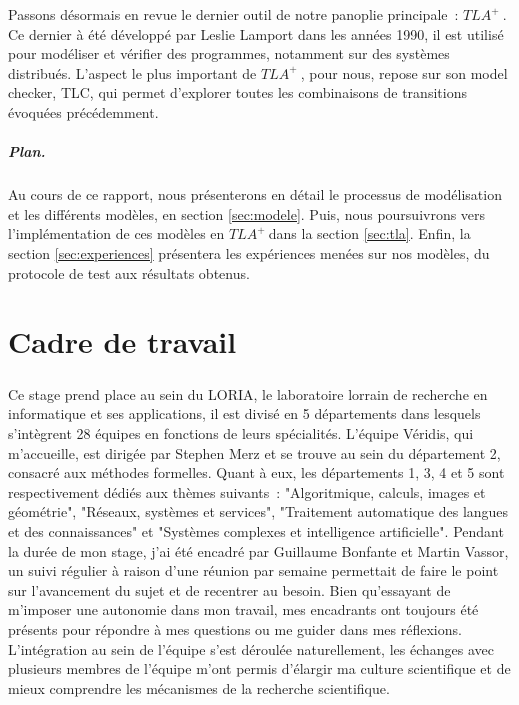 \documentclass[oneside, a4paper, 11pt]{book}
\newcommand{\TLA}{\ensuremath{TLA^+~}}
\begin{document}
\noindent
Passons désormais en revue le dernier outil de notre panoplie principale~: \TLA. 
Ce dernier à été développé par Leslie Lamport dans les années 1990, il est utilisé pour modéliser et vérifier des programmes, notamment sur des systèmes distribués. 
L'aspect le plus important de \TLA, pour nous, repose sur son model checker, TLC, qui permet d'explorer toutes les combinaisons de transitions évoquées précédemment.
\\
\paragraph{Plan.} Au cours de ce rapport, nous présenterons en détail le processus de modélisation et les différents modèles, en section \ref{sec:modele}. Puis, nous poursuivrons vers l'implémentation de ces modèles en \TLA dans la section \ref{sec:tla}.
Enfin, la section \ref{sec:experiences} présentera les expériences menées sur nos modèles, du protocole de test aux résultats obtenus.










\chapter{Cadre de travail}
\paragraph{} 
Ce stage prend place au sein du LORIA, le laboratoire lorrain de recherche en informatique et ses applications, il est divisé en 5 départements dans lesquels s'intègrent 28 équipes en fonctions de leurs spécialités.
L'équipe Véridis, qui m'accueille, est dirigée par Stephen Merz et se trouve au sein du département 2, consacré aux méthodes formelles. Quant à eux, les départements 1, 3, 4 et 5 sont respectivement dédiés aux thèmes suivants~: "Algoritmique, calculs, images et géométrie", "Réseaux, systèmes et services", "Traitement automatique des langues et des connaissances" et "Systèmes complexes et intelligence artificielle".
Pendant la durée de mon stage, j'ai été encadré par Guillaume Bonfante et Martin Vassor, un suivi régulier à raison d'une réunion par semaine permettait de faire le point sur l'avancement du sujet et de recentrer au besoin.
Bien qu'essayant de m'imposer une autonomie dans mon travail, mes encadrants ont toujours été présents pour répondre à mes questions ou me guider dans mes réflexions.
L'intégration au sein de l'équipe s'est déroulée naturellement, les échanges avec plusieurs membres de l'équipe m'ont permis d'élargir ma culture scientifique et de mieux comprendre les mécanismes de la recherche scientifique.
\end{document}
